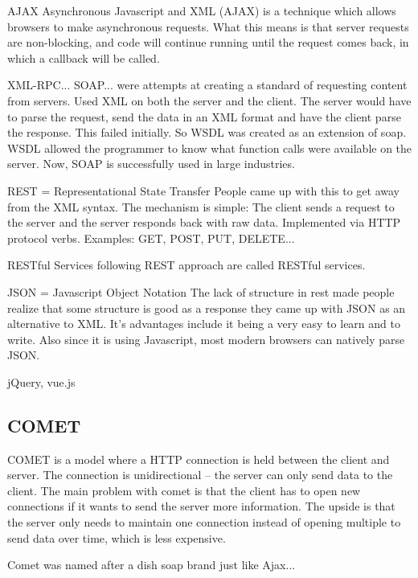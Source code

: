 \documentclass[fancy,11pt,titlestyle=display]{style/elegantbook}
\begin{document}
\begin{definition}{AJAX}{}
Asynchronous Javascript and XML (AJAX) is a technique which allows browsers to make asynchronous requests. What this means is that server requests are non-blocking, and code will continue running until the request comes back, in which a callback will be called.
\end{definition}

XML-RPC...  SOAP... were attempts at creating a standard of requesting content from servers.
Used XML on both the server and the client. The server would have to parse the request, send the data in an XML format and have the client parse the response. 
This failed initially. So WSDL was created as an extension of soap. WSDL allowed the programmer to know what function calls were available on the server.
Now, SOAP is successfully used in large industries.

REST = Representational State Transfer
People came up with this to get away from the XML syntax. The mechanism is simple: The client sends a request to the server and the server responds back with raw data.
Implemented via HTTP protocol verbs. Examples: GET, POST, PUT, DELETE...

\begin{definition}{RESTful}{}
Services following REST approach are called RESTful services.
\end{definition}

JSON = Javascript Object Notation
The lack of structure in rest made people realize that some structure is good as a response they came up with JSON as an alternative to XML.
It's advantages include it being a very easy to learn and to write. Also since it is using Javascript, most modern browsers can natively parse JSON. 

\begin{note}
jQuery, vue.js
\end{note}

\subsection*{COMET}
\par COMET is a model where a HTTP connection is held between the client and server. The connection is unidirectional -- the server can only send data to the client. The main problem with comet is that the client has to open new connections if it wants to send the server more information. The upside is that the server only needs to maintain one connection instead of opening multiple to send data over time, which is less expensive.
\begin{note}
Comet was named after a dish soap brand just like Ajax...
\end{note}
\end{document}
